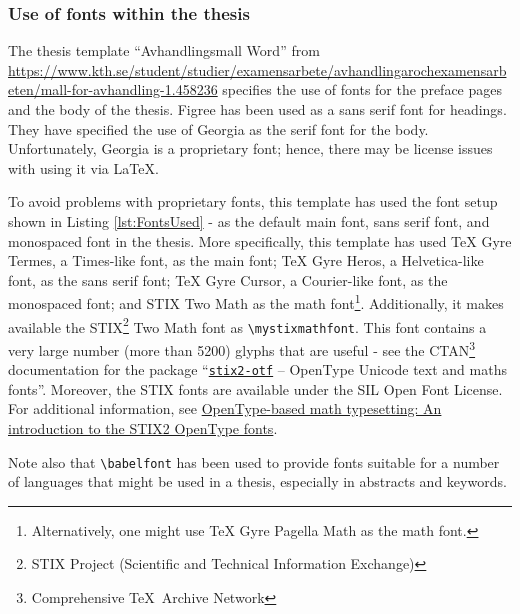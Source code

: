 \documentclass[12pt, twoside]{article}
\begin{document}
\subsubsection{Use of fonts within the thesis}
\label{sec:cycle3useOfFontsWithinThesis}

The thesis template ``\foreignlanguage{swedish}{Avhandlingsmall Word}'' from
\url{https://www.kth.se/student/studier/examensarbete/avhandlingarochexamensarbeten/mall-for-avhandling-1.458236} specifies the use of fonts for the preface pages and the body of the thesis. Figree has been used as a sans serif font for headings. They have specified the use of Georgia as the serif font for the body. Unfortunately, Georgia is a proprietary font; hence, there may be license issues with using it via \LaTeX.

To avoid problems with proprietary fonts, this template has used the font setup shown in Listing \ref{lst:FontsUsed} - as the default main font, sans serif font, and monospaced font in the thesis. More specifically, this template has used TeX Gyre Termes, a Times-like font, as the main font; TeX Gyre Heros, a Helvetica-like font, as the sans serif font;  TeX Gyre Cursor, a Courier-like font, as the monospaced font; and 
STIX Two Math as the math font\footnote{Alternatively, one might use TeX Gyre Pagella Math as the math font.}. Additionally, it makes available the STIX\footnote{STIX Project (Scientific and Technical Information Exchange)} Two Math font as \texttt{\textbackslash mystixmathfont}. This font contains a very large number (more than \num{5200}) glyphs that are useful - see the CTAN\footnote{Comprehensive \TeX\  Archive Network} documentation for the package ``\href{https://ctan.org/pkg/stix2-otf/?lang=en}{\texttt{stix2-otf}} – OpenType Unicode text and maths fonts''. Moreover, the STIX fonts are available under the SIL Open Font License. For additional information, see \href{https://www.overleaf.com/learn/latex/Articles/OpenType-based_math_typesetting%3A_An_introduction_to_the_STIX2_OpenType_fonts}{OpenType-based math typesetting: An introduction to the STIX2 OpenType fonts}.

Note also that \texttt{\textbackslash babelfont} has been used to provide fonts suitable for a number of languages that might be used in a thesis, especially in abstracts and keywords. 
\end{document}
